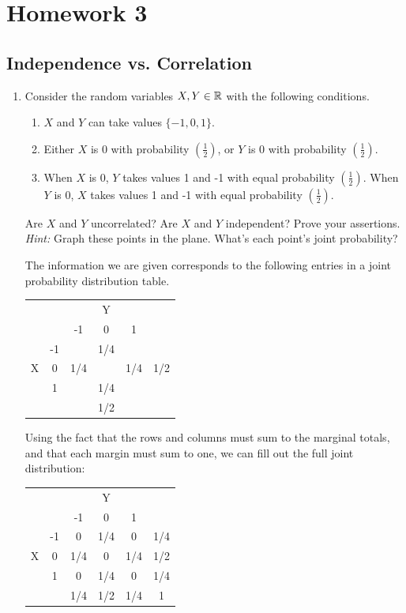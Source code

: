 \section{Homework 3}
\subsection{Independence vs. Correlation}
\begin{enumerate}[label=(\alph*)]
    \item Consider the random variables $X, Y \in \mathbb{R}$ with the following conditions.
    \begin{enumerate}[label=(\roman*)]
        \item $X$ and $Y$ can take values $\{-1, 0, 1\}$.
        \item Either $X$ is 0 with probability $(\frac{1}{2})$, or $Y$ is 0 with probability $(\frac{1}{2})$.
        \item When $X$ is 0, $Y$ takes values 1 and -1 with equal probability $(\frac{1}{2})$. When $Y$ is 0, $X$ takes values 1 and -1 with equal probability $(\frac{1}{2})$.
    \end{enumerate}

    Are $X$ and $Y$ uncorrelated? Are $X$ and $Y$ independent? Prove your
    assertions. \emph{Hint:} Graph these points in the plane. What’s each
    point’s joint probability?

    \begin{mdframed}
      The information we are given corresponds to the following entries in a
      joint probability distribution table.

      \begin{tabular}{c | c | c | c | c | c}
        &    &     & Y   &     & \\
        &    &  -1 & 0   &   1 & \\
        \hline
        & -1 &     & 1/4 &     & \\
        X &  0 & 1/4 &     & 1/4 & 1/2 \\
        &  1 &     & 1/4 &     & \\
        \hline
        &    &     & 1/2 &     & \\
      \end{tabular}

      Using the fact that the rows and columns must sum to the marginal totals,
      and that each margin must sum to one, we can fill out the full joint
      distribution:

      \begin{tabular}{c | c | c | c | c | c}
        &    &     & Y   &     & \\
        &    &  -1 & 0   &   1 & \\
        \hline
        & -1 & 0   & 1/4 & 0   & 1/4\\
      X &  0 & 1/4 & 0   & 1/4 & 1/2 \\
        &  1 &  0  & 1/4 & 0   & 1/4 \\
        \hline
        &    & 1/4 & 1/2 & 1/4 & 1 \\
      \end{tabular}


\end{mdframed}
\end{enumerate}
